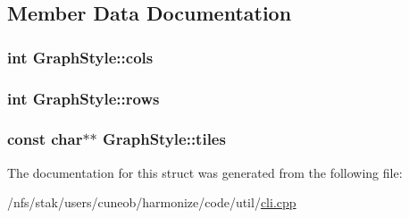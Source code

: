 \subsection{Member Data Documentation}
\hypertarget{structGraphStyle_ae3083074f4fda7b11132f94743d02e8e}{
\subsubsection[{cols}]{\setlength{\rightskip}{0pt plus 5cm}int Graph\-Style\-::cols}}\label{structGraphStyle_ae3083074f4fda7b11132f94743d02e8e}
\hypertarget{structGraphStyle_a68f313e5e77a65d342abfb45c0f35cba}{
\subsubsection[{rows}]{\setlength{\rightskip}{0pt plus 5cm}int Graph\-Style\-::rows}}\label{structGraphStyle_a68f313e5e77a65d342abfb45c0f35cba}
\hypertarget{structGraphStyle_a6bcfefd54bdce1fb09ce54b341e5f615}{
\subsubsection[{tiles}]{\setlength{\rightskip}{0pt plus 5cm}const char$\ast$$\ast$ Graph\-Style\-::tiles}}\label{structGraphStyle_a6bcfefd54bdce1fb09ce54b341e5f615}


The documentation for this struct was generated from the following file\-:\begin{DoxyCompactItemize}
\item 
/nfs/stak/users/cuneob/harmonize/code/util/\hyperlink{cli_8cpp}{cli.\-cpp}\end{DoxyCompactItemize}
